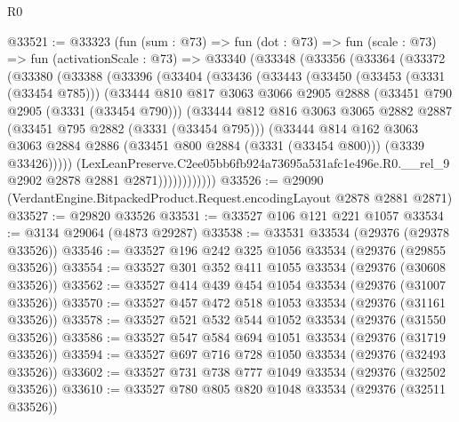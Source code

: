 \begin{lexlean}{R0}
\begin{coremodule}
@33521 := @33323
    (fun (sum : @73) =>
    fun (dot : @73) =>
    fun (scale : @73) =>
    fun (activationScale : @73) =>
    @33340
      (@33348
        (@33356
          (@33364
            (@33372
              (@33380
                (@33388
                  (@33396
                    (@33404
                      (@33436
                        (@33443
                          (@33450
                            (@33453 (@3331 (@33454 @785)))
                            (@33444
                              @810
                              @817
                              @3063
                              @3066
                              @2905
                              @2888
                              (@33451 @790 @2905 (@3331 (@33454 @790)))
                              (@33444
                                @812
                                @816
                                @3063
                                @3065
                                @2882
                                @2887
                                (@33451 @795 @2882 (@3331 (@33454 @795)))
                                (@33444
                                  @814
                                  @162
                                  @3063
                                  @3063
                                  @2884
                                  @2886
                                  (@33451 @800 @2884 (@3331 (@33454 @800)))
                                  (@3339 @33426)))))
                          (LexLeanPreserve.C2ee05bb6fb924a73695a531afc1e496e.R0.__rel_9
                            @2902
                            @2878
                            @2881
                            @2871))))))))))))
@33526 := @29090 (VerdantEngine.BitpackedProduct.Request.encodingLayout @2878 @2881 @2871)
@33527 := @29820 @33526
@33531 := @33527 @106 @121 @221 @1057
@33534 := @3134 @29064 (@4873 @29287)
@33538 := @33531 @33534 (@29376 (@29378 @33526))
@33546 := @33527 @196 @242 @325 @1056 @33534 (@29376 (@29855 @33526))
@33554 := @33527 @301 @352 @411 @1055 @33534 (@29376 (@30608 @33526))
@33562 := @33527 @414 @439 @454 @1054 @33534 (@29376 (@31007 @33526))
@33570 := @33527 @457 @472 @518 @1053 @33534 (@29376 (@31161 @33526))
@33578 := @33527 @521 @532 @544 @1052 @33534 (@29376 (@31550 @33526))
@33586 := @33527 @547 @584 @694 @1051 @33534 (@29376 (@31719 @33526))
@33594 := @33527 @697 @716 @728 @1050 @33534 (@29376 (@32493 @33526))
@33602 := @33527 @731 @738 @777 @1049 @33534 (@29376 (@32502 @33526))
@33610 := @33527 @780 @805 @820 @1048 @33534 (@29376 (@32511 @33526))

\end{coremodule}
\end{lexlean}

